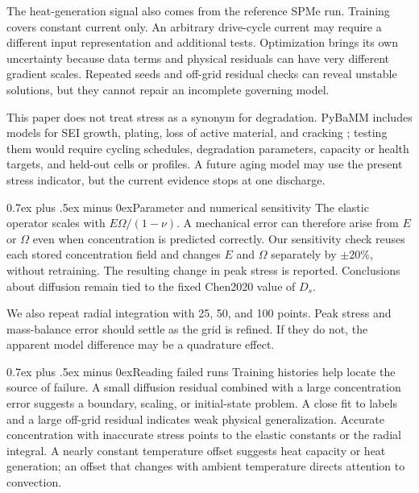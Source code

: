 \documentclass[conference]{IEEEtran}
\makeatletter
\newcommand{\headingfont}{\rmfamily}
\def\subsection{\@startsection{subsection}{2}{\z@}{1.5ex plus 1.5ex minus 0.5ex}%
{0.7ex plus .5ex minus 0ex}{\normalfont\headingfont\normalsize\bfseries}}
\makeatother
\begin{document}
The heat-generation signal also comes from the reference SPMe run. Training covers constant current only. An arbitrary drive-cycle current may require a different input representation and additional tests. Optimization brings its own uncertainty because data terms and physical residuals can have very different gradient scales. Repeated seeds and off-grid residual checks can reveal unstable solutions, but they cannot repair an incomplete governing model.

This paper does not treat stress as a synonym for degradation. PyBaMM includes models for SEI growth, plating, loss of active material, and cracking \cite{sulzer2021pybamm}; testing them would require cycling schedules, degradation parameters, capacity or health targets, and held-out cells or profiles. A future aging model may use the present stress indicator, but the current evidence stops at one discharge.

\subsection{Parameter and numerical sensitivity}
The elastic operator scales with $E\Omega/(1-\nu)$. A mechanical error can therefore arise from $E$ or $\Omega$ even when concentration is predicted correctly. Our sensitivity check reuses each stored concentration field and changes $E$ and $\Omega$ separately by $\pm20\%$, without retraining. The resulting change in peak stress is reported. Conclusions about diffusion remain tied to the fixed Chen2020 value of $D_s$.

We also repeat radial integration with 25, 50, and 100 points. Peak stress and mass-balance error should settle as the grid is refined. If they do not, the apparent model difference may be a quadrature effect.

\subsection{Reading failed runs}
Training histories help locate the source of failure. A small diffusion residual combined with a large concentration error suggests a boundary, scaling, or initial-state problem. A close fit to labels and a large off-grid residual indicates weak physical generalization. Accurate concentration with inaccurate stress points to the elastic constants or the radial integral. A nearly constant temperature offset suggests heat capacity or heat generation; an offset that changes with ambient temperature directs attention to convection.
\end{document}
